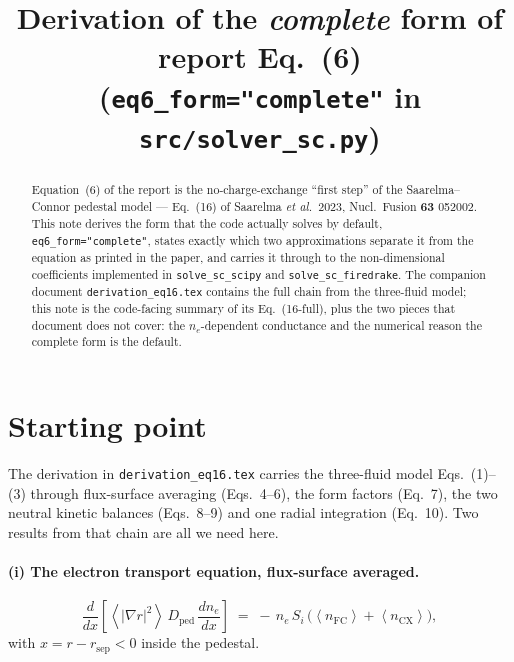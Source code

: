\documentclass[11pt]{article}
\title{Derivation of the \emph{complete} form of report Eq.~(6)\\
  \large (\texttt{eq6\_form="complete"} in \texttt{src/solver\_sc.py})}
\author{}
\date{}
\renewcommand{\ne}{n_{e}}  %
\newcommand{\nfc}{n_{\mathrm{FC}}}
\newcommand{\ncx}{n_{\mathrm{CX}}}
\newcommand{\Si}{S_{i}}
\newcommand{\Dped}{D_{\mathrm{ped}}}
\newcommand{\fsa}[1]{\left\langle #1 \right\rangle}
\newcommand{\gradrsq}{\fsa{|\nabla r|^{2}}}
\begin{document}
\maketitle

\begin{abstract}
\noindent
Equation~(6) of the report is the no-charge-exchange ``first step'' of the
Saarelma--Connor pedestal model --- Eq.~(16) of Saarelma \emph{et al.}~2023,
Nucl.\ Fusion \textbf{63} 052002.  This note derives the form that the code
actually solves by default, \texttt{eq6\_form="complete"}, states exactly
which two approximations separate it from the equation as printed in the
paper, and carries it through to the non-dimensional coefficients
implemented in \texttt{solve\_sc\_scipy} and \texttt{solve\_sc\_firedrake}.
The companion document \texttt{derivation\_eq16.tex} contains the full
chain from the three-fluid model; this note is the code-facing summary of
its Eq.~(16-full), plus the two pieces that document does not cover: the
$\ne$-dependent conductance and the numerical reason the complete form is
the default.
\end{abstract}

\section{Starting point}
\label{sec:start}

The derivation in \texttt{derivation\_eq16.tex} carries the three-fluid
model Eqs.~(1)--(3) through flux-surface averaging (Eqs.~4--6), the form
factors (Eq.~7), the two neutral kinetic balances (Eqs.~8--9) and one
radial integration (Eq.~10).  Two results from that chain are all we need
here.

\paragraph{(i) The electron transport equation, flux-surface averaged.}
\begin{equation}
  \frac{d}{dx}\!\left[\gradrsq\,\Dped\,\frac{d\ne}{dx}\right]
    \;=\; -\,\ne\,\Si\,\bigl(\fsa{\nfc}+\fsa{\ncx}\bigr),
  \label{eq:transport}
\end{equation}
with $x = r - r_{\mathrm{sep}} < 0$ inside the pedestal.
\end{document}
